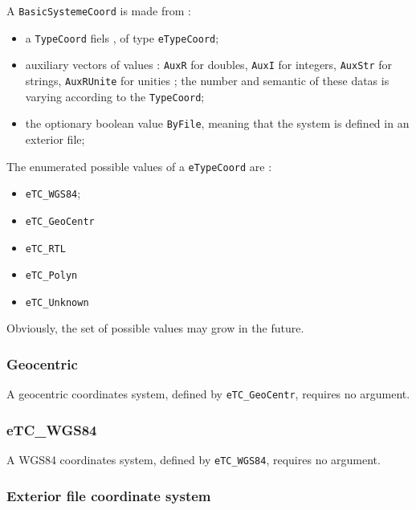 A  {\tt BasicSystemeCoord}  is made from :

\begin{itemize}
   \item  a {\tt TypeCoord}  fiels , of type {\tt eTypeCoord};
   \item auxiliary vectors of values : {\tt AuxR} for doubles, {\tt AuxI} for integers,
         {\tt AuxStr} for strings, {\tt AuxRUnite} for unities ; the  number and semantic of these datas is
         varying according  to  the  {\tt TypeCoord};

    \item the optionary boolean value {\tt ByFile}, meaning that the system is defined in an exterior file;
    
\end{itemize}

The enumerated possible values of a  {\tt eTypeCoord} are :

\begin{itemize}
   \item  {\tt eTC\_WGS84};
   \item  {\tt eTC\_GeoCentr}
   \item  {\tt eTC\_RTL}
   \item  {\tt eTC\_Polyn}
   \item  {\tt eTC\_Unknown} 
\end{itemize}

Obviously, the set of possible values may  grow in the future.


\subsubsection{Geocentric}

A geocentric coordinates system, defined by  {\tt eTC\_GeoCentr}, requires no argument.

\subsubsection{eTC\_WGS84}

A WGS84 coordinates system, defined by  {\tt eTC\_WGS84}, requires no argument.


\subsubsection{Exterior file coordinate system}


